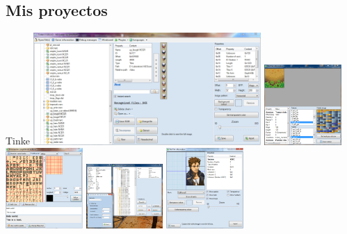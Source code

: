 \subsection{Mis proyectos}
\begin{frame}{Tinke}
    \centering
    \includegraphics[width=0.65\textwidth]{imgs/tinke_preview.png}
    \vfill
    \includegraphics[width=0.22\textwidth]{imgs/tinke1.png}
    \hfill
    \includegraphics[width=0.22\textwidth]{imgs/tinke2.png}
    \hfill
    \includegraphics[width=0.22\textwidth]{imgs/tinke3.png}
    \hfill
    \includegraphics[width=0.22\textwidth]{imgs/tinke4.png}
\end{frame}

